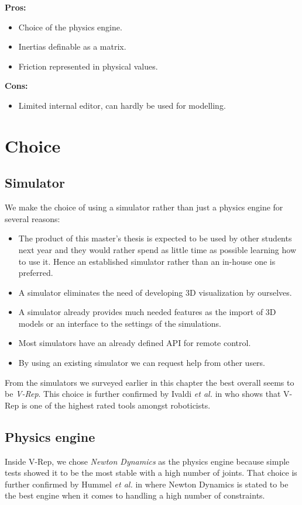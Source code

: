 \textbf{Pros:}
\begin{itemize}
\item Choice of the physics engine.
\item Inertias definable as a matrix.
\item Friction represented in physical values.
\end{itemize}

\textbf{Cons:}
\begin{itemize}
\item Limited internal editor, can hardly be used for modelling.
\end{itemize}

\section{Choice}
\subsection{Simulator}
We make the choice of using a simulator rather than just a physics engine for several reasons:\begin{itemize}
\item The product of this master's thesis is expected to be used by other students next year and they would rather spend as little time as possible learning how to use it. Hence an established simulator rather than an in-house one is preferred.
\item A simulator eliminates the need of developing 3D visualization by ourselves.
\item A simulator already provides much needed features as the import of 3D models or an interface to the settings of the simulations.
\item Most simulators have an already defined API for remote control.
\item By using an existing simulator we can request help from other users.
\end{itemize}

From the simulators we surveyed earlier in this chapter the best overall seems to be \emph{V-Rep}. This choice is further confirmed by Ivaldi \emph{et al.} in \cite{ivaldi2014tools} who shows that V-Rep is one of the highest rated tools amongst roboticists.

\subsection{Physics engine}
Inside V-Rep, we chose \emph{Newton Dynamics} as the physics engine because simple tests showed it to be the most stable with a high number of joints. That choice is further confirmed by Hummel \textit{et al.} in \cite{hummel2012evaluation} where Newton Dynamics is stated to be the best engine when it comes to handling a high number of constraints.

